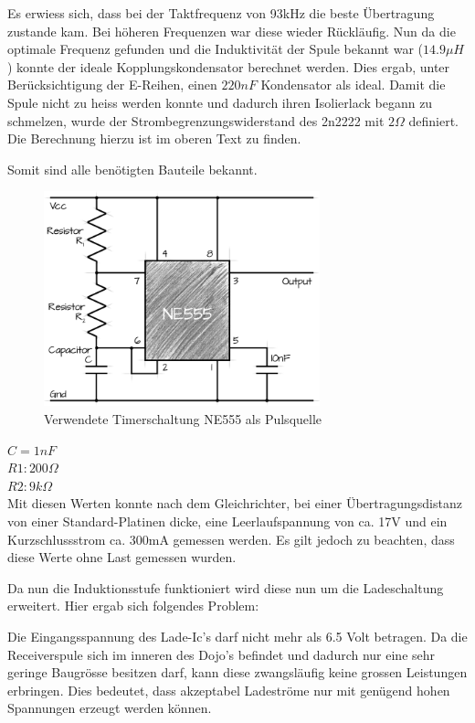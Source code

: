 Es erwiess sich, dass bei der Taktfrequenz von 93kHz die beste Übertragung zustande kam. Bei höheren Frequenzen war diese wieder Rückläufig. Nun da die optimale Frequenz gefunden und die Induktivität der Spule bekannt war ($14.9\mu H$) konnte der ideale Kopplungskondensator berechnet werden. Dies ergab, unter Berücksichtigung der E-Reihen, einen $220nF$ Kondensator als ideal. Damit die Spule nicht zu heiss werden konnte und dadurch ihren Isolierlack begann zu schmelzen, wurde der Strombegrenzungswiderstand des 2n2222 mit $2\Omega$ definiert. Die Berechnung hierzu ist im oberen Text zu finden.

Somit sind alle benötigten Bauteile bekannt.

\begin{figure}[H]
	\begin{center}
		\includegraphics[width=80mm]{data/Ne555circuit.png}
		\caption[Verwendete Timerschaltung NE555 als Pulsquelle]{Verwendete Timerschaltung NE555 als Pulsquelle} %
		\label{fig:NE555}
	\end{center}
\end{figure}

$C= 1nF$\\
$R1: 200\Omega$\\
$R2:9 k\Omega$\\

Mit diesen Werten konnte nach dem Gleichrichter, bei einer Übertragungsdistanz von einer Standard-Platinen dicke, eine Leerlaufspannung von ca. 17V und ein Kurzschlussstrom ca. 300mA gemessen werden. Es gilt jedoch zu beachten, dass diese Werte ohne Last gemessen wurden. 

Da nun die Induktionsstufe funktioniert wird diese nun um die Ladeschaltung erweitert. Hier ergab sich folgendes Problem:

Die Eingangsspannung des Lade-Ic’s darf nicht mehr als 6.5 Volt betragen. Da die Receiverspule sich im inneren des Dojo’s befindet und dadurch nur eine sehr geringe Baugrösse besitzen darf, kann diese zwangsläufig keine grossen Leistungen erbringen. Dies bedeutet, dass akzeptabel Ladeströme nur mit genügend hohen Spannungen erzeugt werden können.


